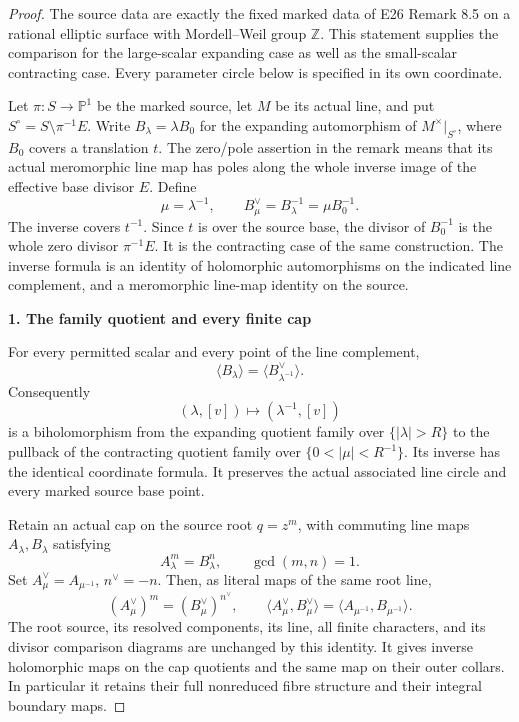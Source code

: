\begin{proof}
The source data are exactly the fixed marked data of E26 Remark 8.5
on a rational elliptic surface with Mordell--Weil group \(\mathbb Z\).
This statement supplies the comparison for the large-scalar expanding
case as well as the small-scalar contracting case. Every parameter
circle below is specified in its own coordinate.

Let \(\pi:S\to\mathbb P^1\) be the marked source, let \(M\) be its
actual line, and put \(S^\circ=S\setminus\pi^{-1}E\). Write
\(B_\lambda=\lambda B_0\) for the expanding automorphism of
\(M^{\times}|_{S^\circ}\), where \(B_0\) covers a translation \(t\).
The zero/pole assertion in the remark means that its actual
meromorphic line map has poles along the whole inverse image of
the effective base divisor \(E\). Define
\[
 \mu=\lambda^{-1},\qquad
 B^\vee_\mu=B_\lambda^{-1}=\mu B_0^{-1}.
 \tag{EX.1}
\]
The inverse covers \(t^{-1}\). Since \(t\) is over the source base,
the divisor of \(B_0^{-1}\) is the whole zero divisor \(\pi^{-1}E\).
It is the contracting case of the same construction. The inverse
formula is an identity of holomorphic automorphisms on the indicated
line complement, and a meromorphic line-map identity on the source.

\par

\medskip\noindent\textbf{1. The family quotient and every finite cap}

\par\nobreak

For every permitted scalar and every point of the line complement,
\[
 \langle B_\lambda\rangle=\langle B^\vee_{\lambda^{-1}}\rangle.
 \tag{EX.2}
\]
Consequently
\[
 (\lambda,[v])\longmapsto(\lambda^{-1},[v])
 \tag{EX.3}
\]
is a biholomorphism from the expanding quotient family over
\(\{|\lambda|>R\}\) to the pullback of the contracting quotient
family over \(\{0<|\mu|<R^{-1}\}\). Its inverse has the identical
coordinate formula. It preserves the actual associated line
circle and every marked source base point.

Retain an actual cap on the source root \(q=z^m\), with commuting
line maps \(A_\lambda,B_\lambda\) satisfying
\[
 A_\lambda^m=B_\lambda^n,\qquad \gcd(m,n)=1.
\]
Set \(A^\vee_\mu=A_{\mu^{-1}}\), \(n^\vee=-n\). Then, as literal
maps of the same root line,
\[
 (A^\vee_\mu)^m=(B^\vee_\mu)^{n^\vee},\qquad
 \langle A^\vee_\mu,B^\vee_\mu\rangle
       =\langle A_{\mu^{-1}},B_{\mu^{-1}}\rangle.
 \tag{EX.4}
\]
The root source, its resolved components, its line, all finite
characters, and its divisor comparison diagrams are unchanged by
this identity. It gives inverse holomorphic maps on the cap
quotients and the same map on their outer collars. In particular
it retains their full nonreduced fibre structure and their
integral boundary maps.


\end{proof}
